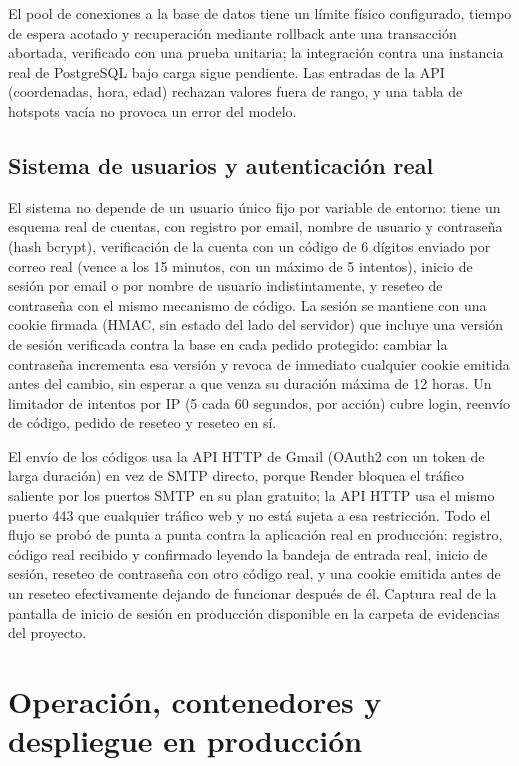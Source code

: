 El pool de conexiones a la base de datos tiene un límite físico
configurado, tiempo de espera acotado y recuperación mediante rollback
ante una transacción abortada, verificado con una prueba unitaria; la
integración contra una instancia real de PostgreSQL bajo carga sigue
pendiente. Las entradas de la API (coordenadas, hora, edad) rechazan
valores fuera de rango, y una tabla de hotspots vacía no provoca un
error del modelo.

\subsection{Sistema de usuarios y autenticación real}

El sistema no depende de un usuario único fijo por variable de entorno:
tiene un esquema real de cuentas, con registro por email, nombre de
usuario y contraseña (hash bcrypt), verificación de la cuenta con un
código de 6 dígitos enviado por correo real (vence a los 15 minutos, con
un máximo de 5 intentos), inicio de sesión por email o por nombre de
usuario indistintamente, y reseteo de contraseña con el mismo mecanismo
de código. La sesión se mantiene con una cookie firmada (HMAC, sin
estado del lado del servidor) que incluye una versión de sesión
verificada contra la base en cada pedido protegido: cambiar la
contraseña incrementa esa versión y revoca de inmediato cualquier cookie
emitida antes del cambio, sin esperar a que venza su duración máxima de
12 horas. Un limitador de intentos por IP (5 cada 60 segundos, por
acción) cubre login, reenvío de código, pedido de reseteo y reseteo en
sí.

El envío de los códigos usa la API HTTP de Gmail (OAuth2 con un token de
larga duración) en vez de SMTP directo, porque Render bloquea el tráfico
saliente por los puertos SMTP en su plan gratuito; la API HTTP usa el
mismo puerto 443 que cualquier tráfico web y no está sujeta a esa
restricción. Todo el flujo se probó de punta a punta contra la
aplicación real en producción: registro, código real recibido y
confirmado leyendo la bandeja de entrada real, inicio de sesión, reseteo
de contraseña con otro código real, y una cookie emitida antes de un
reseteo efectivamente dejando de funcionar después de él. Captura real
de la pantalla de inicio de sesión en producción disponible en la
carpeta de evidencias del proyecto.

\section{Operación, contenedores y despliegue en producción}

